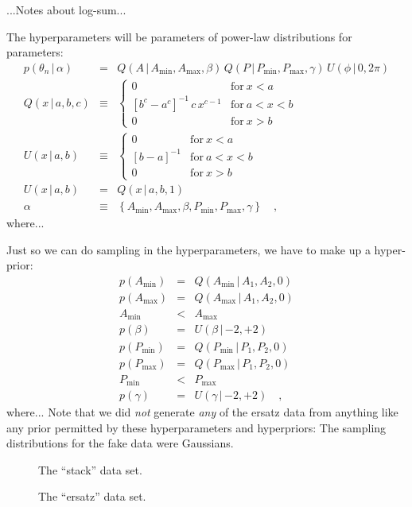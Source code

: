 \documentclass[12pt]{article}
\newcommand{\given}{\,|\,}
\newcommand{\pdf}{p}
\newcommand{\setof}[1]{\left\{{#1}\right\}}
\newcommand{\parsymbol}{\theta}
\newcommand{\pars}{\parsymbol_n}
\newcommand{\hyperpars}{\alpha}
\newcommand{\amp}{A}
\newcommand{\period}{P}
\newcommand{\phase}{\phi}
\newcommand{\ampmin}{\amp_{\min}}
\newcommand{\ampmax}{\amp_{\max}}
\newcommand{\amppower}{\beta}
\newcommand{\periodmin}{\period_{\min}}
\newcommand{\periodmax}{\period_{\max}}
\newcommand{\periodpower}{\gamma}
\newcommand{\powerlaw}{Q}
\newcommand{\uniform}{U}
\begin{document}
...Notes about log-sum...

The hyperparameters will be parameters of power-law distributions for
parameters:
\begin{eqnarray}
\pdf(\pars\given\hyperpars)
  &=&
\powerlaw(\amp\given\ampmin,\ampmax,\amppower)\,\powerlaw(\period\given\periodmin,\periodmax,\periodpower)\,\uniform(\phase\given 0,2\pi)
\\
\powerlaw(x\given a,b,c)
  &\equiv&
\left\{\begin{array}{cl}
  0 & \mbox{for}~x < a \\
  {[b^c - a^c]}^{-1}\,c\,x^{c-1} & \mbox{for}~a < x < b \\
  0 & \mbox{for}~x > b
\end{array}\right.
\\
\uniform(x\given a,b)
  &\equiv&
\left\{\begin{array}{cl}
  0 & \mbox{for}~x < a \\
  {[b - a]}^{-1} & \mbox{for}~a < x < b \\
  0 & \mbox{for}~x > b
\end{array}\right.
\\
\uniform(x\given a,b)
  &=& \powerlaw(x\given a,b,1)
\\
\hyperpars
  &\equiv&
\setof{\ampmin, \ampmax, \amppower, \periodmin, \periodmax, \periodpower}
\quad,
\end{eqnarray}
where...

Just so we can do sampling in the hyperparameters, we have to make up
a hyper-prior:
\begin{eqnarray}
\pdf(\ampmin)
  &=&
\powerlaw(\ampmin\given\amp_1,\amp_2,0)
\\
\pdf(\ampmax)
  &=&
\powerlaw(\ampmax\given\amp_1,\amp_2,0)
\\
\ampmin &<& \ampmax
\\
\pdf(\amppower)
  &=&
\uniform(\amppower\given {-2},{+2})
\\
\pdf(\periodmin)
  &=&
\powerlaw(\periodmin\given\period_1,\period_2,0)
\\
\pdf(\periodmax)
  &=&
\powerlaw(\periodmax\given\period_1,\period_2,0)
\\
\periodmin &<& \periodmax
\\
\pdf(\periodpower)
  &=&
\uniform(\periodpower\given {-2},{+2})
\quad,
\end{eqnarray}
where...  Note that we did \emph{not} generate \emph{any} of the
ersatz data from anything like any prior permitted by these
hyperparameters and hyperpriors: The sampling distributions for the
fake data were Gaussians.

\clearpage
\begin{figure}
\caption{The ``stack'' data set.\label{fig:stack}}
\end{figure}

\clearpage
\begin{figure}
\caption{The ``ersatz'' data set.\label{fig:ersatz}}
\end{figure}
\end{document}
